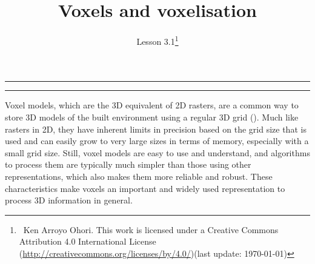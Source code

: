 
\newcommand{\lessonNumber}{Lesson 3.1}

\newtheorem{definition}{Definition}

\title{Voxels and voxelisation}


\ohead*{\lessonNumber}
\titlehead{\thispagestyle{headings}}
\author{\lessonNumber\footnote{\ccbysa\ Ken Arroyo Ohori. This work is licensed under a Creative Commons Attribution 4.0 International License (\url{http://creativecommons.org/licenses/by/4.0/})\newline(last update: \today)}}
\date{}

\pagestyle{scrheadings}

\maketitle

\noindent\rule{5cm}{0.4pt}
\tableofcontents
\noindent\rule{5cm}{0.4pt}
\vspace{5mm}


Voxel models, which are the 3D equivalent of 2D rasters, are a common way to store 3D models of the built environment using a regular 3D grid ().
Much like rasters in 2D, they have inherent limits in precision based on the grid size that is used and can easily grow to very large sizes in terms of memory, especially with a small grid size.
Still, voxel models are easy to use and understand, and algorithms to process them are typically much simpler than those using other representations, which also makes them more reliable and robust.
These characteristics make voxels an important and widely used representation to process 3D information in general.


